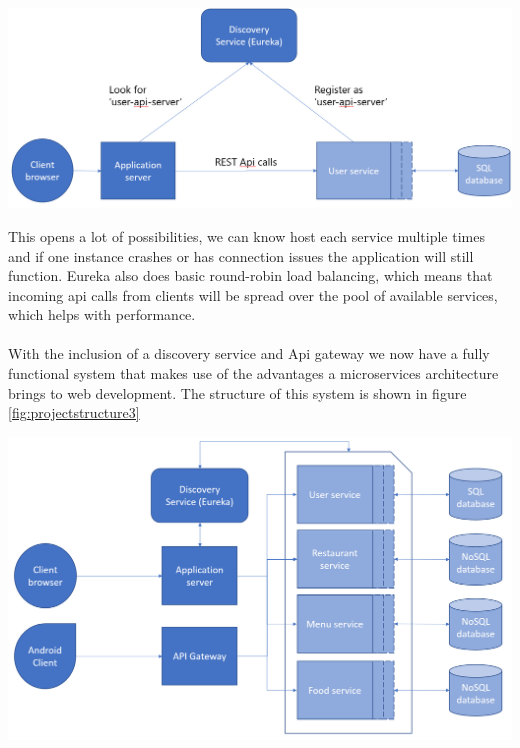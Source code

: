 \documentclass[12pt]{article}
\newenvironment{Figure}
	{\par\medskip\noindent\minipage{\linewidth}}
	{\endminipage\par\medskip}
\begin{document}
\begin{multicols}{2}
\begin{Figure}
	\centering
	\includegraphics[width=\linewidth]{illustrations/discoverydesign.png}
	\label{fig:discovery}
\end{Figure}

\noindent This opens a lot of possibilities, we can know host each service multiple times and if one instance crashes or has connection issues the application will still function. Eureka also does basic round-robin load balancing, which means that incoming api calls from clients will be spread over the pool of available services, which helps with performance.
\\\\
With the inclusion of a discovery service and Api gateway we now have a fully functional system that makes use of the advantages a microservices architecture brings to web development. The structure of this system is shown in figure \ref{fig:projectstructure3}

\begin{Figure}
	\centering
	\includegraphics[width=\linewidth]{illustrations/projectstructure3b.png}
	\label{fig:projectstructure3}
\end{Figure}



\end{multicols}
\end{document}
